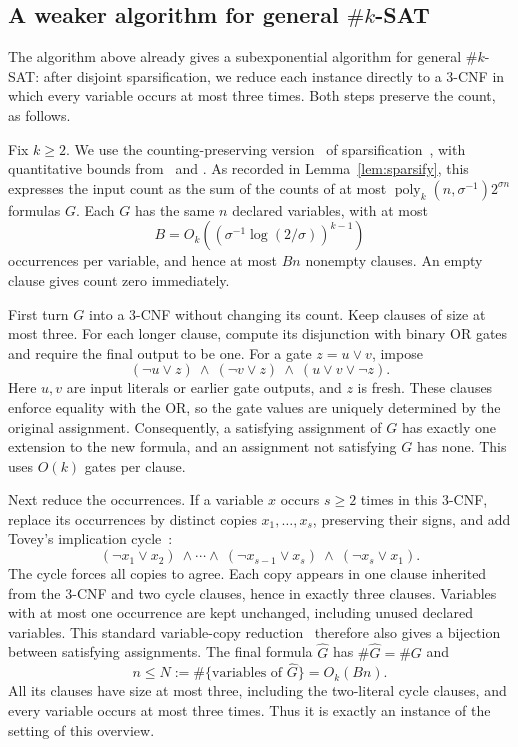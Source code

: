 \documentclass[11pt,reqno]{amsart}
\numberwithin{equation}{section}
\theoremstyle{definition}\newtheorem{definition}[theorem]{Definition}
\theoremstyle{remark}\newtheorem{remark}[theorem]{Remark}
\renewcommand{\le}{\leqslant}
\renewcommand{\ge}{\geqslant}
\begin{document}
\subsection{A weaker algorithm for general \texorpdfstring{$\#k$-SAT}{\#k-SAT}}
\label{subsec:preview-general-sat}
The algorithm above already gives a subexponential algorithm for
general $\#k$-SAT: after disjoint sparsification, we reduce each
instance directly to a $3$-CNF in which every variable occurs at
most three times. Both steps preserve the count, as follows.

Fix $k\ge2$. We use the counting-preserving version~\cite[Appendix~A]{DHMTW}
of sparsification~\cite{IPZ}, with quantitative bounds
from~\cite[Section~6]{CIP} and
\cite[Lemma~5.14 and equation~(5.4)]{CalabroThesis}.
As recorded in Lemma~\ref{lem:sparsify}, this expresses the input count as the sum of
the counts of at most
$\operatorname{poly}_k(n,\sigma^{-1})2^{\sigma n}$ formulas $G$.
Each $G$ has the same $n$ declared variables, with at most
\[
 B=O_k\!\left((\sigma^{-1}\log(2/\sigma))^{k-1}\right)
\]
occurrences per variable, and hence at most $Bn$ nonempty clauses.
An empty clause gives count zero immediately.

First turn $G$ into a $3$-CNF without changing its count. Keep
clauses of size at most three. For each longer clause, compute its
disjunction with binary OR gates and require the final output to
be one. For a gate $z=u\vee v$, impose
\[
 (\neg u\vee z)\ \wedge\ (\neg v\vee z)\ \wedge\
 (u\vee v\vee\neg z).
\]
Here $u,v$ are input literals or earlier gate outputs, and $z$ is
fresh. These clauses enforce equality with the OR, so the gate
values are uniquely determined by the original assignment.
Consequently, a satisfying assignment of $G$ has exactly one
extension to the new formula, and an assignment not satisfying
$G$ has none. This uses $O(k)$ gates per clause.

Next reduce the occurrences. If a variable $x$ occurs $s\ge2$
times in this $3$-CNF, replace its occurrences by distinct copies
$x_1,\ldots,x_s$, preserving their signs, and add Tovey's implication
cycle~\cite[p.~86]{Tov84}:
\[
 (\neg x_1\vee x_2)\ \wedge\cdots\wedge\
 (\neg x_{s-1}\vee x_s)\ \wedge\ (\neg x_s\vee x_1).
\]
The cycle forces all copies to agree. Each copy appears in one
clause inherited from the $3$-CNF and two cycle clauses, hence
in exactly three clauses. Variables with at most one occurrence
are kept unchanged, including unused declared variables.
This standard variable-copy reduction~\cite[Proposition~4.7]{Gol08}
therefore also gives a bijection between satisfying assignments.
The final formula $\widehat G$ has $\#\widehat G=\#G$ and
\[
 n\le N:=\#\{\text{variables of }\widehat G\}=O_k(Bn).
\]
All its clauses have size at most three, including the two-literal
cycle clauses, and every variable occurs at most three times.
Thus it is exactly an instance of the setting of this overview.
\end{document}
